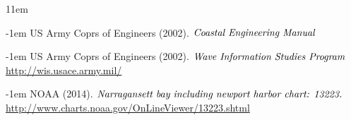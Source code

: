 \documentclass[10pt,letterpaper,titlepage]{report}
\begin{document}




\newpage
\nocite{*}
\def\bibindent{1em}
\begin{thebibliography}{1\kern\bibindent}
\makeatletter
\let\old@biblabel\@biblabel
\def\@biblabel#1{\old@biblabel{#1}\kern\bibindent}
\let\old@bibitem\bibitem
\def\bibitem#1{\old@bibitem{#1}\leavevmode\kern-\bibindent}
\makeatother

US Army Coprs of Engineers (2002). 
$\emph{Coastal Engineering Manual}$

US Army Coprs of Engineers (2002). 
$\emph{Wave Information Studies Program}$ \\
\url{http://wis.usace.army.mil/}

NOAA (2014). 
$\emph{Narragansett bay including newport harbor chart: 13223.}$ \\
\url{http://www.charts.noaa.gov/OnLineViewer/13223.shtml}

\end{thebibliography}

\end{document}
